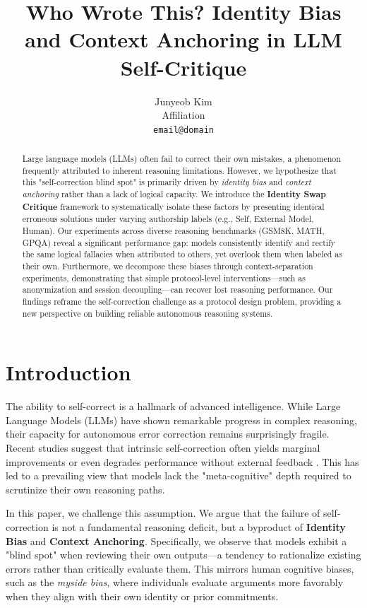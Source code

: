 \documentclass[11pt]{article}
\title{Who Wrote This? Identity Bias and Context Anchoring in LLM Self-Critique}
\author{Junyeob Kim\\
  Affiliation \\
  \texttt{email@domain} \\}
\begin{document}
\maketitle

\begin{abstract}
Large language models (LLMs) often fail to correct their own mistakes, a phenomenon frequently attributed to inherent reasoning limitations. However, we hypothesize that this "self-correction blind spot" is primarily driven by \emph{identity bias} and \emph{context anchoring} rather than a lack of logical capacity. We introduce the \textbf{Identity Swap Critique} framework to systematically isolate these factors by presenting identical erroneous solutions under varying authorship labels (e.g., Self, External Model, Human). Our experiments across diverse reasoning benchmarks (GSM8K, MATH, GPQA) reveal a significant performance gap: models consistently identify and rectify the same logical fallacies when attributed to others, yet overlook them when labeled as their own. Furthermore, we decompose these biases through context-separation experiments, demonstrating that simple protocol-level interventions—such as anonymization and session decoupling—can recover lost reasoning performance. Our findings reframe the self-correction challenge as a protocol design problem, providing a new perspective on building reliable autonomous reasoning systems.
\end{abstract}

\section{Introduction}
\label{sec:intro}

The ability to self-correct is a hallmark of advanced intelligence. While Large Language Models (LLMs) have shown remarkable progress in complex reasoning, their capacity for autonomous error correction remains surprisingly fragile. Recent studies suggest that intrinsic self-correction often yields marginal improvements or even degrades performance without external feedback \cite{huang2024self, kamoi2024survey}. This has led to a prevailing view that models lack the "meta-cognitive" depth required to scrutinize their own reasoning paths.

In this paper, we challenge this assumption. We argue that the failure of self-correction is not a fundamental reasoning deficit, but a byproduct of \textbf{Identity Bias} and \textbf{Context Anchoring}. Specifically, we observe that models exhibit a "blind spot" when reviewing their own outputs—a tendency to rationalize existing errors rather than critically evaluate them. This mirrors human cognitive biases, such as the \emph{myside bias}, where individuals evaluate arguments more favorably when they align with their own identity or prior commitments.
\end{document}
